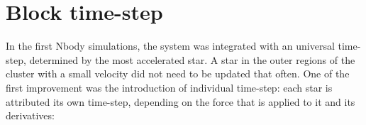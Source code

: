 %
%
%
%
%
%
\section{Block time-step}
 
In the first Nbody simulations, the system was integrated with an universal time-step, determined by the most accelerated star. A star in the outer regions of the cluster with a small velocity did not need to be updated that often. One of the first improvement  was the introduction of individual time-step: each star is attributed its own time-step, depending on the force that is applied to it and its derivatives:

